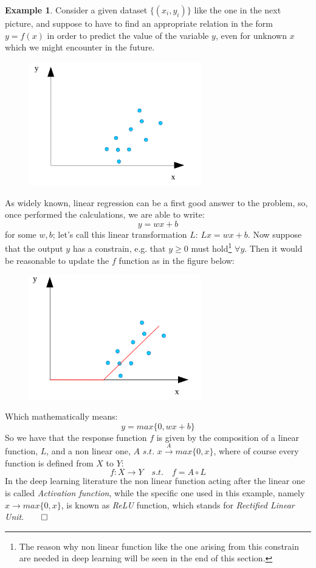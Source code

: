 \documentclass[12pt, a4paper]{report}
\theoremstyle{definition}
\newtheorem{Example}{Example}
\begin{document}
\begin{Example}\label{example1}
Consider a given dataset $\{(x_i,y_i)\}$ like the one in the next picture, and suppose to have to find an appropriate relation in the form $y=f(x)$ in order to predict the value of the variable $y$, even for unknown $x$ which we might encounter in the future.
\begin{figure}[h]
	\centering
	\includegraphics[width=7.5cm]{img/regression1}
	\caption{}
\end{figure}
\newline As widely known, linear regression can be a first good answer to the problem, so, once performed the calculations, we are able to write:
\[
y=wx + b
\]
for some $w,b$; let's call this linear transformation $L\!: \, Lx=wx+b$. Now suppose that the output $y$ has a constrain, e.g. that $y\ge0$ must hold\footnote{The reason why non linear function like the one arising from this constrain are needed in deep learning will be seen in the end of this section.} $ \forall y $. Then it would be reasonable to update the $f$ function as in the figure below:
\begin{figure}[h]
	\centering
	\includegraphics[width=7.5cm]{img/regression2} 
	\caption{}
\end{figure}
\newline Which mathematically means:
\[
y=max\{0,wx+b\}
\]
So we have that the response function $f$ is given by the composition of a linear function, $L$, and a non linear one, $A\,\,s.t.\,\, x\overset{A}{\longrightarrow}max\{0,x\}$, where of course every function is defined from $X$ to $Y$:
\[
f:X\rightarrow Y\quad s.t.\quad f=A\circ L
\]
In the deep learning literature the non linear function acting after the linear one is called \textit{Activation function}, while the specific one used in this example, namely $x\rightarrow max\{0,x\}$, is known as \textit{ReLU} function, which stands for \textit{Rectified Linear Unit}.$\qed$
\end{Example}
\end{document}
